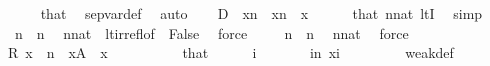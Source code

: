 \begin{isabellebody}
\ \ \ \ \isamarkupfalse%
\ that\ \isamarkupfalse%
\ sep{\isacharunderscore}{\kern0pt}var{\isacharunderscore}{\kern0pt}def\ \isamarkupfalse%
\ auto\isanewline
\ \ \isamarkupfalse%
\ D\ {\isacharcolon}{\kern0pt}\ {\isachardoublequoteopen}x{\isacharless}{\kern0pt}n{\isacharhash}{\kern0pt}{\isacharplus}{\kern0pt}{}{\isachardoublequoteclose}\ \ {\isachardoublequoteopen}x{\isasymin}{}{\isacharhash}{\kern0pt}{\isacharplus}{\kern0pt}n{\isachardoublequoteclose}\ \ x\isanewline
\ \ \ \ \isamarkupfalse%
\ that\ {\isacartoucheopen}n{\isasymin}nat{\isacartoucheclose}\ ltI\ \isamarkupfalse%
\ simp\isanewline
\ \ \isamarkupfalse%
\ {\isachardoublequoteopen}{\isasymnot}\ {}{\isacharhash}{\kern0pt}{\isacharplus}{\kern0pt}n\ {\isacharless}{\kern0pt}\ {}{\isacharhash}{\kern0pt}{\isacharplus}{\kern0pt}n{\isachardoublequoteclose}\ \isamarkupfalse%
\ {\isacartoucheopen}n{\isasymin}nat{\isacartoucheclose}\ \ lt{\isacharunderscore}{\kern0pt}irrefl{\isacharbrackleft}{\kern0pt}of\ {\isacharunderscore}{\kern0pt}\ False{\isacharbrackright}{\kern0pt}\ \isamarkupfalse%
\ force\isanewline
\ \ \isamarkupfalse%
\ {\isachardoublequoteopen}{\isasymnot}\ {}{\isacharhash}{\kern0pt}{\isacharplus}{\kern0pt}n\ {\isacharless}{\kern0pt}\ {}{\isacharhash}{\kern0pt}{\isacharplus}{\kern0pt}n{\isachardoublequoteclose}\ \isamarkupfalse%
\ {\isacartoucheopen}n{\isasymin}nat{\isacartoucheclose}\ \isamarkupfalse%
\ force\isanewline
\ \ \isamarkupfalse%
\ R{\isacharcolon}{\kern0pt}\ {\isachardoublequoteopen}x\ {\isacharless}{\kern0pt}\ {}{\isacharhash}{\kern0pt}{\isacharplus}{\kern0pt}n{\isachardoublequoteclose}\ \ {\isachardoublequoteopen}x{\isasymin}{\isacharquery}{\kern0pt}A{\isachardoublequoteclose}\ \ x\isanewline
\ \ \isamarkupfalse%
\ {\isacharminus}{\kern0pt}\isanewline
\ \ \ \ \isamarkupfalse%
\ that\isanewline
\ \ \ \ \isamarkupfalse%
\ i\ \isanewline
\ \ \ \ \ \ {\isachardoublequoteopen}i{\isacharless}{\kern0pt}n{\isachardoublequoteclose}\ {\isachardoublequoteopen}x{\isacharequal}{\kern0pt}{}{\isacharhash}{\kern0pt}{\isacharplus}{\kern0pt}i{\isachardoublequoteclose}\ \isanewline
\ \ \ \ \ \ \isamarkupfalse%
\ weak{\isacharunderscore}{\kern0pt}def\isanewline

\end{isabellebody}
